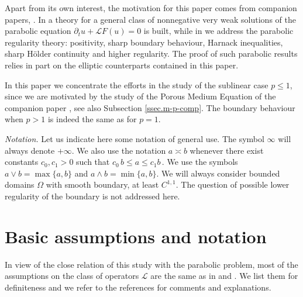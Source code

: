 \documentclass[11pt]{article}
\numberwithin{equation}{section}
\newcommand{\A}{\mathcal{L}}
\newcommand{\n}{F}
\begin{document}
Apart from its own interest, the motivation for this paper comes from companion papers, \cite{BV-PPR2-1, BFV-Parabolic}. In \cite{BV-PPR2-1} a theory for a general class of nonnegative very weak solutions of the parabolic equation $\partial_t u+\A\n(u)=0$ is built, while in \cite{BFV-Parabolic} we address the parabolic regularity theory: positivity, sharp boundary behaviour, Harnack inequalities, sharp H\"older continuity and higher regularity. The proof of such parabolic results relies in part on the elliptic counterparts contained in this paper.\vspace{-1mm}

In this paper we concentrate the efforts in the study of the sublinear case $p\le 1$, since we are motivated by the study of the Porous Medium Equation of the companion paper \cite{BFV-Parabolic}, see also Subsection \ref{ssec.m-p-comp}. The boundary behaviour when $p> 1$  is indeed the same as for $p=1$.\vspace{-1mm}

\noindent\textit{Notation. }Let us indicate here some notation of general use. The symbol $\infty$ will always denote $+\infty$. We also use the notation $a\asymp b$ whenever there exist constants $c_0,c_1>0$ such that $c_0\,b\le a\le c_1 b$\,. We use the symbols $a\vee b=\max\{a,b\}$ and $a\wedge b=\min\{a,b\}$.
We will always consider bounded domains $\Omega$ with smooth boundary, at least $C^{1,1}$. The question of possible lower regularity of the boundary is not addressed here.



\section{Basic assumptions and notation}\label{sec.hyp.FL}

In view of the close relation of this study with the parabolic problem,
most of the assumptions on the class of operators $\A$ are the same as in
 \cite{BV-PPR2-1} and \cite{BFV-Parabolic}. We list them for definiteness
and we refer to the references for comments and explanations.
\end{document}

